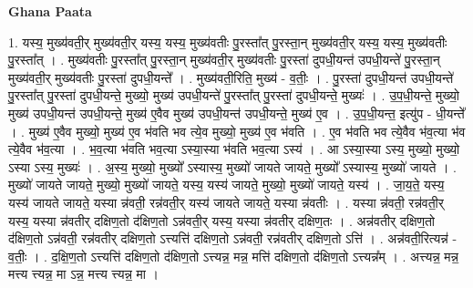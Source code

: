 \documentclass[17pt]{extarticle}
\begin{document}
\textbf{Ghana Paata } \newline

1. यस्य॒ मुख्य॑वती॒र् मुख्य॑वती॒र् यस्य॒ यस्य॒ मुख्य॑वतीः पु॒रस्ता᳚त् पु॒रस्ता॒न् मुख्य॑वती॒र् यस्य॒ यस्य॒ मुख्य॑वतीः पु॒रस्ता᳚त् । . मुख्य॑वतीः पु॒रस्ता᳚त् पु॒रस्ता॒न् मुख्य॑वती॒र् मुख्य॑वतीः पु॒रस्ता॑ दुपधी॒यन्त॑ उपधी॒यन्ते॑ पु॒रस्ता॒न् मुख्य॑वती॒र् मुख्य॑वतीः पु॒रस्ता॑ दुपधी॒यन्ते᳚ । . मुख्य॑वती॒रिति॒ मुख्य॑ - व॒तीः॒ । . पु॒रस्ता॑ दुपधी॒यन्त॑ उपधी॒यन्ते॑ पु॒रस्ता᳚त् पु॒रस्ता॑ दुपधी॒यन्ते॒ मुख्यो॒ मुख्य॑ उपधी॒यन्ते॑ पु॒रस्ता᳚त् पु॒रस्ता॑ दुपधी॒यन्ते॒ मुख्यः॑ । . उ॒प॒धी॒यन्ते॒ मुख्यो॒ मुख्य॑ उपधी॒यन्त॑ उपधी॒यन्ते॒ मुख्य॑ ए॒वैव मुख्य॑ उपधी॒यन्त॑ उपधी॒यन्ते॒ मुख्य॑ ए॒व । . उ॒प॒धी॒यन्त॒ इत्यु॑प - धी॒यन्ते᳚ । . मुख्य॑ ए॒वैव मुख्यो॒ मुख्य॑ ए॒व भ॑वति भव त्ये॒व मुख्यो॒ मुख्य॑ ए॒व भ॑वति । . ए॒व भ॑वति भव त्ये॒वैव भ॑व॒त्या भ॑व त्ये॒वैव भ॑व॒त्या । . भ॒व॒त्या भ॑वति भव॒त्या ऽस्या॒स्या भ॑वति भव॒त्या ऽस्य॑ । . आ ऽस्या॒स्या ऽस्य॒ मुख्यो॒ मुख्यो॒ ऽस्या ऽस्य॒ मुख्यः॑ । . अ॒स्य॒ मुख्यो॒ मुख्यो᳚ ऽस्यास्य॒ मुख्यो॑ जायते जायते॒ मुख्यो᳚ ऽस्यास्य॒ मुख्यो॑ जायते । . मुख्यो॑ जायते जायते॒ मुख्यो॒ मुख्यो॑ जायते॒ यस्य॒ यस्य॑ जायते॒ मुख्यो॒ मुख्यो॑ जायते॒ यस्य॑ । . जा॒य॒ते॒ यस्य॒ यस्य॑ जायते जायते॒ यस्या न्न॑वती॒ रन्न॑वती॒र् यस्य॑ जायते जायते॒ यस्या न्न॑वतीः । . यस्या न्न॑वती॒ रन्न॑वती॒र् यस्य॒ यस्या न्न॑वतीर् दक्षिण॒तो द॑क्षिण॒तो ऽन्न॑वती॒र् यस्य॒ यस्या न्न॑वतीर् दक्षिण॒तः । . अन्न॑वतीर् दक्षिण॒तो द॑क्षिण॒तो ऽन्न॑वती॒ रन्न॑वतीर् दक्षिण॒तो ऽत्त्यत्ति॑ दक्षिण॒तो ऽन्न॑वती॒ रन्न॑वतीर् दक्षिण॒तो ऽत्ति॑ । . अन्न॑वती॒रित्यन्न॑ - व॒तीः॒ । . द॒क्षि॒ण॒तो ऽत्त्यत्ति॑ दक्षिण॒तो द॑क्षिण॒तो ऽत्त्यन्न॒ मन्न॒ मत्ति॑ दक्षिण॒तो द॑क्षिण॒तो ऽत्त्यन्न᳚म् । . अत्त्यन्न॒ मन्न॒ मत्त्य त्त्यन्न॒ मा ऽन्न॒ मत्त्य त्त्यन्न॒ मा । \newline
\end{document}
